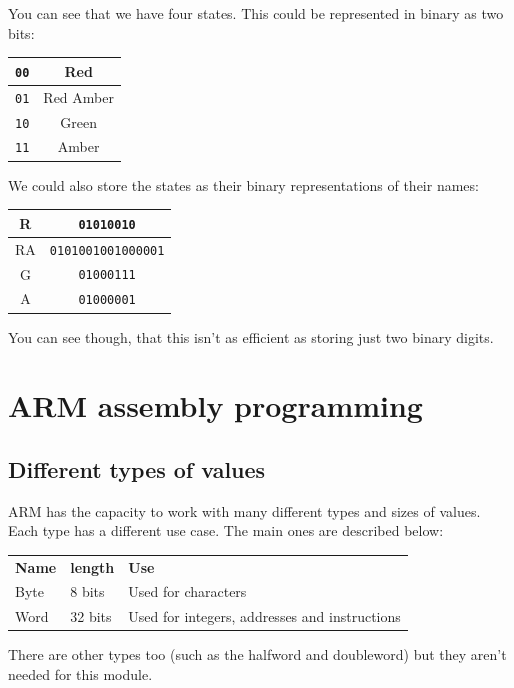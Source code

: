 You can see that we have four states. This could be represented in binary as two
bits:

\begin{center}
	\begin{tabular}{|c|c|}
		\hline
		{\tt 00} & Red\\ \hline
		{\tt 01} & Red Amber\\ \hline
		{\tt 10} & Green\\ \hline
		{\tt 11} & Amber\\ \hline
	\end{tabular}
\end{center}

We could also store the states as their binary representations of their names:

\begin{center}
	\begin{tabular}{|c|c|}
		\hline
		R & {\tt 01010010}\\ \hline
		RA & {\tt 0101001001000001}\\ \hline
		G & {\tt 01000111}\\ \hline
		A & {\tt 01000001}\\ \hline
	\end{tabular}
\end{center}

You can see though, that this isn't as efficient as storing just two binary
digits.

\section{ARM assembly programming}

\subsection{Different types of values}

ARM has the capacity to work with many different types and sizes of values. Each
type has a different use case. The main ones are described below:

\begin{tabularx}{\textwidth}{l l X}
	{\bf Name} & {\bf length} & {\bf Use}\\
	Byte & 8 bits & Used for characters\\
	Word & 32 bits & Used for integers, addresses and instructions\\
\end{tabularx}

There are other types too (such as the halfword and doubleword) but they aren't
needed for this module.

